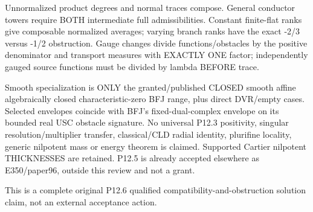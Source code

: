 \documentclass[11pt]{article}
\begin{document}
\begin{ReviewBody}
Unnormalized product degrees and normal traces compose. General conductor towers require BOTH intermediate full admissibilities. Constant finite-flat ranks give composable normalized averages; varying branch ranks have the exact -2/3 versus -1/2 obstruction. Gauge changes divide functions/obstacles by the positive denominator and transport measures with EXACTLY ONE factor; independently gauged source functions must be divided by lambda BEFORE trace.

Smooth specialization is ONLY the granted/published CLOSED smooth affine algebraically closed characteristic-zero BFJ range, plus direct DVR/empty cases. Selected envelopes coincide with BFJ's fixed-dual-complex envelope on its bounded real USC obstacle signature. No universal P12.3 positivity, singular resolution/multiplier transfer, classical/CLD radial identity, plurifine locality, generic nilpotent mass or energy theorem is claimed. Supported Cartier nilpotent THICKNESSES are retained. P12.5 is already accepted elsewhere as E350/paper96, outside this review and not a grant.

This is a complete original P12.6 qualified compatibility-and-obstruction solution claim, not an external acceptance action.
\end{ReviewBody}
\end{document}
